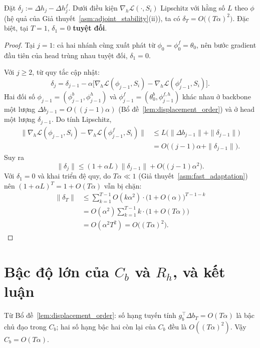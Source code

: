 \begin{lemma}
\label{lem:head_divergence}
Đặt $\delta_j := \Delta h_j - \Delta h_j^f$. Dưới điều kiện $\nabla_h\mathcal{L}(\cdot,S_i)$ Lipschitz với hằng số $L$ theo $\phi$ (hệ quả của Giả thuyết~\ref{asm:adjoint_stability}(ii)), ta có $\delta_T = O\big((T\alpha)^2\big)$. Đặc biệt, tại $T=1$, $\delta_1 = 0$ \textbf{tuyệt đối}.
\end{lemma}
\begin{proof}
Tại $j=1$: cả hai nhánh cùng xuất phát từ $\phi_0 = \phi_0^f = \theta_0$, nên bước gradient đầu tiên của head trùng nhau tuyệt đối, $\delta_1 = 0$.

Với $j \ge 2$, từ quy tắc cập nhật:
\[
    \delta_j = \delta_{j-1} - \alpha\Big[\nabla_h\mathcal{L}(\phi_{j-1},S_i) - \nabla_h\mathcal{L}(\phi_{j-1}^f,S_i)\Big].
\]
Hai đối số $\phi_{j-1} = (\phi_{j-1}^b,\phi_{j-1}^h)$ và $\phi_{j-1}^f=(\theta_0^b,\phi_{j-1}^{f,h})$ khác nhau ở backbone một lượng $\Delta b_{j-1} = O((j-1)\alpha)$ (Bổ đề~\ref{lem:displacement_order}) và ở head một lượng $\delta_{j-1}$. Do tính Lipschitz,
\begin{align*}
    \big\|\nabla_h\mathcal{L}(\phi_{j-1},S_i) - \nabla_h\mathcal{L}(\phi_{j-1}^f,S_i)\big\| &\le L\big(\|\Delta b_{j-1}\| + \|\delta_{j-1}\|\big)\\
                                                                                            &= O\big((j-1)\alpha + \|\delta_{j-1}\|\big).
\end{align*}
Suy ra
\[
    \|\delta_j\| \le (1+\alpha L)\|\delta_{j-1}\| + O\big((j-1)\alpha^2\big).
\]
Với $\delta_1=0$ và khai triển đệ quy, do $T\alpha\ll1$ (Giả thuyết~\ref{asm:fast_adaptation}) nên $(1+\alpha L)^{T} = 1+O(T\alpha)$ vẫn bị chặn:
\begin{align*}
    \|\delta_T\| &\le \sum_{k=1}^{T-1} O(k\alpha^2)\cdot\big(1+O(\alpha)\big)^{T-1-k}\\
    &= O(\alpha^2)\sum_{k=1}^{T-1} k \cdot\big(1+O(T\alpha)\big)\\
    &= O(\alpha^2 T^2) = O\big((T\alpha)^2\big).
\end{align*}
\end{proof}

\section{Bậc độ lớn của $C_b$ và $R_h$, và kết luận}

Từ Bổ đề~\ref{lem:displacement_order}: số hạng tuyến tính $g_b^\top\Delta b_T = O(T\alpha)$ là bậc chủ đạo trong $C_b$; hai số hạng bậc hai còn lại của $C_b$ đều là $O((T\alpha)^2)$. Vậy $C_b = O(T\alpha)$.

